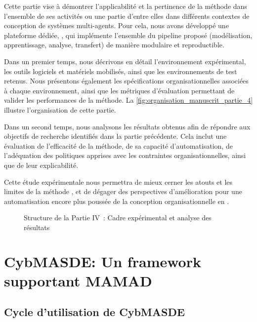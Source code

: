 \noindent
Cette partie vise à démontrer l'applicabilité et la pertinence de la méthode  dans l'ensemble de ses activités ou une partie d'entre elles dans différents contextes de conception de systèmes multi-agents. Pour cela, nous avons développé une plateforme dédiée, , qui implémente l'ensemble du pipeline proposé (modélisation, apprentissage, analyse, transfert) de manière modulaire et reproductible.

\medskip

\noindent
Dans un premier temps, nous décrivons en détail l'environnement expérimental, les outils logiciels et matériels mobilisés, ainsi que les environnements de test retenus. Nous présentons également les spécifications organisationnelles associées à chaque environnement, ainsi que les métriques d'évaluation permettant de valider les performances de la méthode. La \autoref{fig:organisation_manuscrit_partie_4} illustre l'organisation de cette partie.

\medskip

\noindent
Dans un second temps, nous analysons les résultats obtenus afin de répondre aux objectifs de recherche identifiés dans la partie précédente. Cela inclut une évaluation de l'efficacité de la méthode, de sa capacité d'automatisation, de l'adéquation des politiques apprises avec les contraintes organisationnelles, ainsi que de leur explicabilité.

\medskip

\noindent
Cette étude expérimentale nous permettra de mieux cerner les atouts et les limites de la méthode , et de dégager des perspectives d'amélioration pour une automatisation encore plus poussée de la conception organisationnelle en .

\begin{figure}[h!]
  \centering
  \resizebox{0.7\linewidth}{!}{%
    
  }
  \caption{Structure de la Partie IV~: Cadre expérimental et analyse des résultats}
  \label{fig:organisation_manuscrit_partie_4}
\end{figure}

\clearpage
\thispagestyle{empty}
\null
\newpage

\chapter{CybMASDE: Un framework supportant MAMAD}
\label{sec:cybmasde}

\section*{Cycle d'utilisation de CybMASDE}\label{sec:cybmasde_cycle}

